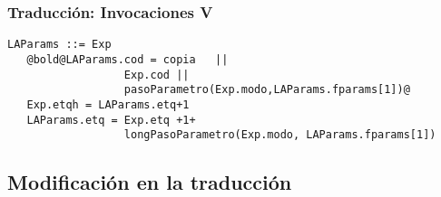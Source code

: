 \documentclass[hyperref={pdfpagelabels=false},tree-dvips,compress]{beamer}
\begin{document}
\begin{frame}[fragile]
\frametitle{Traducción: Invocaciones V}


\begin{lstlisting}[style=gramaticas,basicstyle=\scriptsize\ttfamily,mathescape]
LAParams ::= Exp
   @bold@LAParams.cod = copia   ||
                  Exp.cod ||
                  pasoParametro(Exp.modo,LAParams.fparams[1])@
   Exp.etqh = LAParams.etq+1
   LAParams.etq = Exp.etq +1+
                  longPasoParametro(Exp.modo, LAParams.fparams[1])
\end{lstlisting}

\end{frame}
\subsection{Modificación en la traducción}
\end{document}
